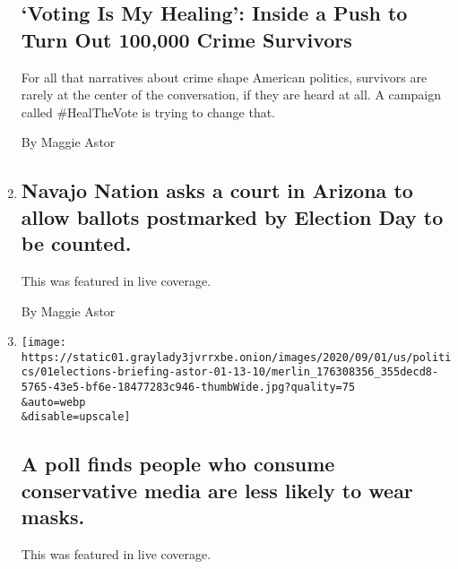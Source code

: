 \begin{enumerate}
  \hypertarget{voting-is-my-healing-inside-a-push-to-turn-out-100000-crime-survivors}{%
  \subsection{`Voting Is My Healing': Inside a Push to Turn Out 100,000
  Crime
  Survivors}\label{voting-is-my-healing-inside-a-push-to-turn-out-100000-crime-survivors}}

  For all that narratives about crime shape American politics, survivors
  are rarely at the center of the conversation, if they are heard at
  all. A campaign called \#HealTheVote is trying to change that.

  By Maggie Astor
\item
  \href{/live/2020/09/02/us/trump-vs-biden/navajo-nation-asks-a-court-in-arizona-to-allow-ballots-postmarked-by-election-day-to-be-counted}{}

  \hypertarget{navajo-nation-asks-a-court-in-arizona-to-allow-ballots-postmarked-by-election-day-to-be-counted}{%
  \subsection{Navajo Nation asks a court in Arizona to allow ballots
  postmarked by Election Day to be
  counted.}\label{navajo-nation-asks-a-court-in-arizona-to-allow-ballots-postmarked-by-election-day-to-be-counted}}

  This was featured in live coverage.

  By Maggie Astor
\item
  \href{/live/2020/09/01/us/trump-vs-biden/a-poll-finds-people-who-consume-conservative-media-are-less-likely-to-wear-masks}{}

  \texttt{[image: https://static01.graylady3jvrrxbe.onion/images/2020/09/01/us/politics/01elections-briefing-astor-01-13-10/merlin\_176308356\_355decd8-5765-43e5-bf6e-18477283c946-thumbWide.jpg?quality=75\\\&auto=webp\\\&disable=upscale]}

  \hypertarget{a-poll-finds-people-who-consume-conservative-media-are-less-likely-to-wear-masks}{%
  \subsection{A poll finds people who consume conservative media are
  less likely to wear
  masks.}\label{a-poll-finds-people-who-consume-conservative-media-are-less-likely-to-wear-masks}}

  This was featured in live coverage.


\end{enumerate}
